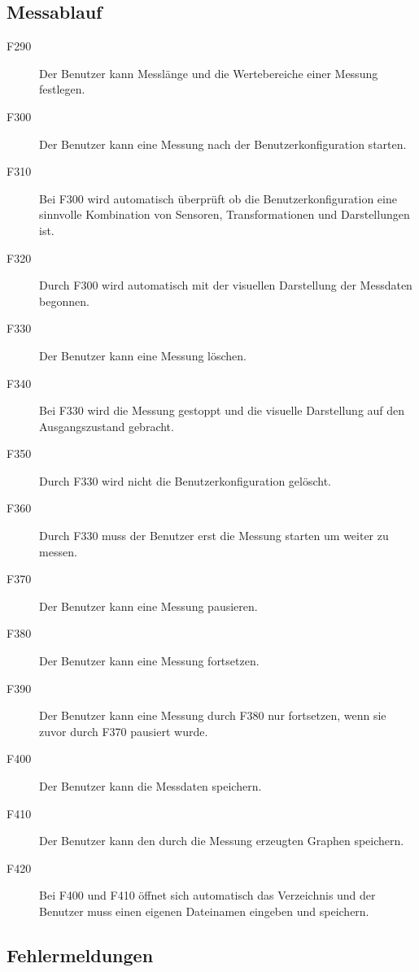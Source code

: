 \documentclass[parskip=full]{scrartcl}
\begin{document}
\subsection{Messablauf}

\begin{description}

\item[F290] Der Benutzer kann Messlänge und die Wertebereiche einer Messung festlegen.
\item[F300] Der Benutzer kann eine Messung nach der \gls{Benutzerkonfiguration} starten.
\item[F310] Bei F300 wird automatisch überprüft ob die \gls{Benutzerkonfiguration} eine sinnvolle Kombination von Sensoren, Transformationen und Darstellungen ist.
\item[F320] Durch F300 wird automatisch mit der visuellen Darstellung der Messdaten begonnen.
\item[F330] Der Benutzer kann eine Messung löschen.
\item[F340] Bei F330 wird die Messung gestoppt und die visuelle Darstellung auf den Ausgangszustand gebracht.
\item[F350] Durch F330 wird nicht die \gls{Benutzerkonfiguration} gelöscht.
\item[F360] Durch F330 muss der Benutzer erst die Messung starten um weiter zu messen.
\item[F370] Der Benutzer kann eine Messung pausieren.
\item[F380] Der Benutzer kann eine Messung fortsetzen.
\item[F390] Der Benutzer kann eine Messung durch F380 nur fortsetzen, wenn sie zuvor durch F370 pausiert wurde.
\item[F400] Der Benutzer kann die Messdaten speichern.
\item[F410] Der Benutzer kann den durch die Messung erzeugten Graphen speichern.
\item[F420] Bei F400 und F410 öffnet sich automatisch das Verzeichnis und der Benutzer muss einen eigenen Dateinamen eingeben und speichern. 

\end{description}

\subsection{Fehlermeldungen}
\end{document}
